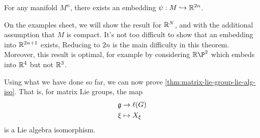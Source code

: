 \documentclass{article}
\begin{document}
\begin{theorem}
    For any manifold \(M^n\), there exists an embedding \(\psi : M \hookrightarrow \mathbb{R}^{2n}\).
\end{theorem}

On the examples sheet, we will show the result for \(\mathbb{R}^N\), and with the additional assumption that \(M\) is compact. It's not too difficult to show that an embedding into \(\mathbb{R}^{2n+1}\) exists, Reducing to \(2n\) is the main difficulty in this theorem. Moreover, this result is optimal, for example by considering \(\R\P^2\) which embeds into \(\mathbb{R}^4\) but not \(\mathbb{R}^3\).

\lec

Using what we have done so far, we can now prove \cref{thm:matrix-lie-group-lie-alg-iso}. That is, for matrix Lie groups, the map
\begin{align*}
    \mathfrak{g} &\to \ell(G) \\
    \xi &\mapsto X_\xi
\end{align*}
is a Lie algebra isomorphism.
\end{document}
